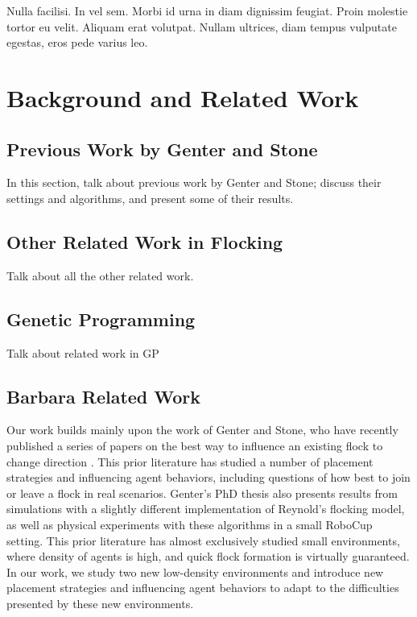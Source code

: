\begin{savequote}[75mm]
Nulla facilisi. In vel sem. Morbi id urna in diam dignissim feugiat. Proin molestie tortor eu velit. Aliquam erat volutpat. Nullam ultrices, diam tempus vulputate egestas, eros pede varius leo.
\end{savequote}

\chapter{Background and Related Work}


\section{Previous Work by Genter and Stone}
In this section, talk about previous work by Genter and Stone; discuss their
settings and algorithms, and present some of their results.

\section{Other Related Work in Flocking}
Talk about all the other related work.

\section{Genetic Programming}
Talk about related work in GP

\section{Barbara Related Work}
Our work builds mainly upon the work of Genter and Stone, who have recently
published a series of papers on the best way to influence an existing flock to
change direction \cite{genter2015placement, genter2014neighborsorientherd,
genter2013visionstationary, genter2013backsearch,
genter2016facegoalfacecurrent, genter201612steplookahead}.
This prior literature has studied a number of placement strategies and
influencing agent behaviors, including questions of how best to join or leave a
flock in real scenarios.
Genter's PhD thesis also presents results from simulations with a slightly
different implementation of Reynold's flocking model, as well as physical
experiments with these algorithms in a small RoboCup setting.
This prior literature has almost exclusively studied small environments, where
density of agents is high, and quick flock formation is virtually guaranteed.
In our work, we study two new low-density environments and introduce new
placement strategies and influencing agent behaviors to adapt to the
difficulties presented by these new environments.

